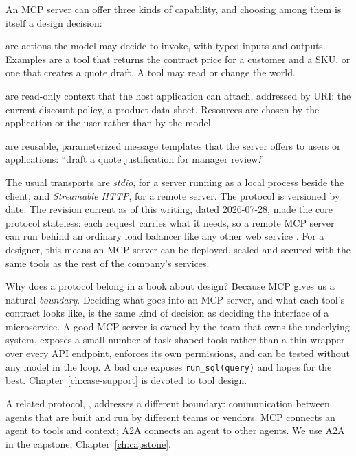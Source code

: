 An MCP server can offer three kinds of capability, and choosing among them is itself a design decision:
\begin{description}[leftmargin=1em,itemsep=2pt]
  \item[Tools] are actions the model may decide to invoke, with typed inputs and outputs. Examples are a tool that returns the contract price for a customer and a SKU, or one that creates a quote draft. A tool may read or change the world.
  \item[Resources] are read-only context that the host application can attach, addressed by URI: the current discount policy, a product data sheet. Resources are chosen by the application or the user rather than by the model.
  \item[Prompts] are reusable, parameterized message templates that the server offers to users or applications: ``draft a quote justification for manager review.''
\end{description}
The usual transports are \emph{stdio}, for a server running as a local process beside the client, and \emph{Streamable HTTP}, for a remote server. The protocol is versioned by date. The revision current as of this writing, dated 2026-07-28, made the core protocol stateless: each request carries what it needs, so a remote MCP server can run behind an ordinary load balancer like any other web service \citep{mcp2026spec}. For a designer, this means an MCP server can be deployed, scaled and secured with the same tools as the rest of the company's services.

Why does a protocol belong in a book about design? Because MCP gives us a natural \emph{boundary}. Deciding what goes into an MCP server, and what each tool's contract looks like, is the same kind of decision as deciding the interface of a microservice. A good MCP server is owned by the team that owns the underlying system, exposes a small number of task-shaped tools rather than a thin wrapper over every API endpoint, enforces its own permissions, and can be tested without any model in the loop. A bad one exposes \texttt{run\_sql(query)} and hopes for the best. Chapter~\ref{ch:case-support} is devoted to tool design.

A related protocol, , addresses a different boundary: communication between agents that are built and run by different teams or vendors. MCP connects an agent to tools and context; A2A connects an agent to other agents. We use A2A in the capstone, Chapter~\ref{ch:capstone}.

